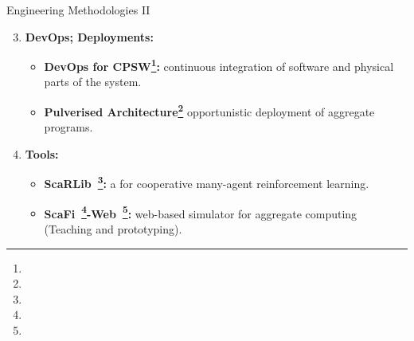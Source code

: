 \documentclass[presentation, 8pt,169]{beamer}\mode<presentation>{\usetheme{AMSBolognaFC}}
\begin{document}
\begin{frame}{Engineering Methodologies II}

  \begin{enumerate}
  \setcounter{enumi}{2}
  \item \textbf{DevOps; Deployments:}
  
  \begin{itemize}
  \item \textbf{DevOps for CPSW\footnote{}:} continuous integration of software and physical parts of the system.
  \item \textbf{Pulverised Architecture\footnote{}} opportunistic deployment of aggregate programs.
 
  \end{itemize}
  \framebreak
  \item \textbf{Tools:}
  
  \begin{itemize}
  \item \textbf{ScaRLib~\footnote{}:} a for cooperative many-agent reinforcement learning.
  \item \textbf{ScaFi~\footnote{}-Web~\footnote{}:} web-based simulator for aggregate computing (Teaching and prototyping).
  \end{itemize}
\end{enumerate}
\end{frame}
\end{document}

